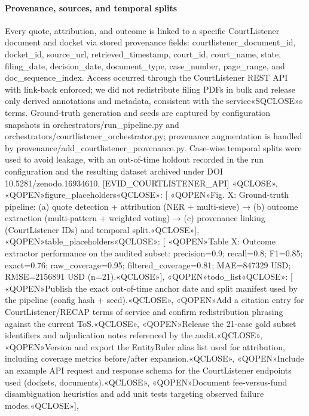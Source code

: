 \paragraph{Provenance, sources, and temporal splits}\label{provenance-sources-and-temporal-splits}

Every quote, attribution, and outcome is linked to a specific CourtListener document and docket via stored provenance fields: courtlistener\_document\_id, docket\_id, source\_url, retrieved\_timestamp, court\_id, court\_name, state, filing\_date, decision\_date, document\_type, case\_number, page\_range, and doc\_sequence\_index. Access occurred through the CourtListener REST API with link-back enforced; we did not redistribute filing PDFs in bulk and release only derived annotations and metadata, consistent with the service«SQCLOSE»s terms. Ground-truth generation and seeds are captured by configuration snapshots in orchestrators/run\_pipeline.py and orchestrators/courtlistener\_orchestrator.py; provenance augmentation is handled by provenance/add\_courtlistener\_provenance.py. Case-wise temporal splits were used to avoid leakage, with an out-of-time holdout recorded in the run configuration and the resulting dataset archived under DOI 10.5281/zenodo.16934610. {[}EVID\_COURTLISTENER\_API{]}
«QCLOSE»,
«QOPEN»figure\_placeholders«QCLOSE»: {[}
«QOPEN»Fig. X: Ground-truth pipeline: (a) quote detection + attribution (NER + multi-sieve) → (b) outcome extraction (multi-pattern + weighted voting) → (c) provenance linking (CourtListener IDs) and temporal split.«QCLOSE»{]},
«QOPEN»table\_placeholders«QCLOSE»: {[}
«QOPEN»Table X: Outcome extractor performance on the audited subset: precision=0.9; recall=0.8; F1=0.85; exact=0.76; raw\_coverage=0.95; filtered\_coverage=0.81; MAE=847329 USD; RMSE=2156891 USD (n=21).«QCLOSE»{]},
«QOPEN»todo\_list«QCLOSE»: {[}
«QOPEN»Publish the exact out-of-time anchor date and split manifest used by the pipeline (config hash + seed).«QCLOSE»,
«QOPEN»Add a citation entry for CourtListener/RECAP terms of service and confirm redistribution phrasing against the current ToS.«QCLOSE»,
«QOPEN»Release the 21-case gold subset identifiers and adjudication notes referenced by the audit.«QCLOSE»,
«QOPEN»Version and export the EntityRuler alias list used for attribution, including coverage metrics before/after expansion.«QCLOSE»,
«QOPEN»Include an example API request and response schema for the CourtListener endpoints used (dockets, documents).«QCLOSE»,
«QOPEN»Document fee-versus-fund disambiguation heuristics and add unit tests targeting observed failure modes.«QCLOSE»{]},
